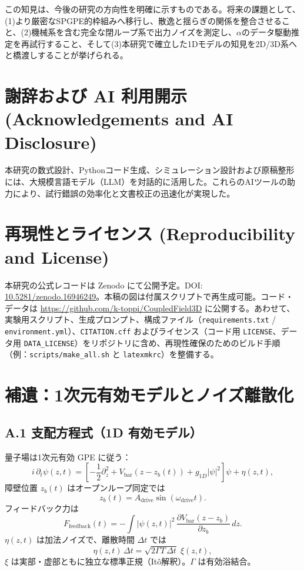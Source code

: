 \documentclass[a4paper,11pt,ja=standard,lualatex]{bxjsarticle}
\begin{document}
この知見は、今後の研究の方向性を明確に示すものである。将来の課題として、(1)より厳密なSPGPE的枠組みへ移行し、散逸と揺らぎの関係を整合させること、(2)機械系を含む完全な閉ループ系で出力ノイズを測定し、$\alpha$のデータ駆動推定を再試行すること、そして(3)本研究で確立した1Dモデルの知見を2D/3D系へと橋渡しすることが挙げられる。

\section*{謝辞および AI 利用開示 (Acknowledgements and AI Disclosure)}
本研究の数式設計、Pythonコード生成、シミュレーション設計および原稿整形には、大規模言語モデル（LLM）を対話的に活用した。これらのAIツールの助力により、試行錯誤の効率化と文書校正の迅速化が実現した。

\section*{再現性とライセンス (Reproducibility and License)}
本研究の公式レコードは Zenodo にて公開予定。DOI: \href{https://doi.org/10.5281/zenodo.16946249}{10.5281/zenodo.16946249}。本稿の図は付属スクリプトで再生成可能。コード・データは \url{https://github.com/k-toppi/CoupledField3D} に公開する。あわせて、実験用スクリプト、生成プロンプト、構成ファイル（\texttt{requirements.txt} / \texttt{environment.yml}）、\texttt{CITATION.cff} およびライセンス（コード用 \texttt{LICENSE}、データ用 \texttt{DATA\_LICENSE}）をリポジトリに含め、再現性確保のためのビルド手順（例：\texttt{scripts/make\_all.sh} と \texttt{latexmkrc}）を整備する。

\FloatBarrier
\appendix
{}

\section{補遺：1次元有効モデルとノイズ離散化}
\label{sec:appendixA}
\subsection*{A.1 支配方程式（1D 有効モデル）}
量子場は1次元有効 GPE に従う：
\begin{equation}
 i\,\partial_t \psi(z,t)
 = \left[-\frac{1}{2}\partial_z^2 + V_{\mathrm{bar}}(z-z_b(t)) + g_{1D}|\psi|^2 \right]\psi + \eta(z,t),
\end{equation}
障壁位置 $z_b(t)$ はオープンループ同定では
\begin{equation}
 z_b(t) = A_{\mathrm{drive}}\sin(\omega_{\mathrm{drive}} t).
\end{equation}
フィードバック力は
\begin{equation}
 F_{\mathrm{feedback}}(t) = -\int |\psi(z,t)|^2 \,\frac{\partial V_{\mathrm{bar}}(z-z_b)}{\partial z_b}\,dz.
\end{equation}
$\eta(z,t)$ は加法ノイズで、離散時間 $\Delta t$ では
\begin{equation}
 \eta(z,t)\,\Delta t = \sqrt{2\Gamma T\,\Delta t}\;\xi(z,t),
\end{equation}
$\xi$ は実部・虚部ともに独立な標準正規（Itô解釈）。$\Gamma$ は有効浴結合。
\end{document}
